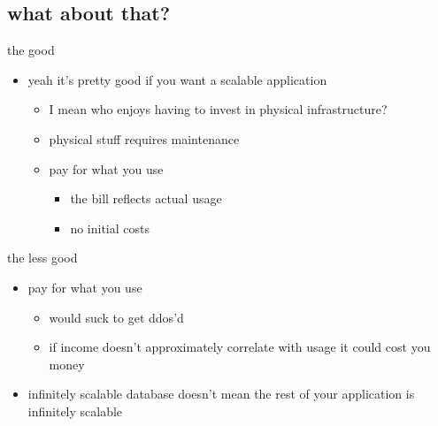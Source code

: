 \documentclass{beamer}
\begin{document}
  \subsection{what about that?}
  \begin{frame}{the good}
    \begin{itemize}
    \item
      yeah it's pretty good if you want a scalable application
      \begin{itemize}
      \item
        I mean who enjoys having to invest in physical infrastructure?
      \item
        physical stuff requires maintenance
      \item
        pay for what you use
        \begin{itemize}
        \item
          the bill reflects actual usage
        \item
          no initial costs
        \end{itemize}
      \end{itemize}
    \end{itemize}
  \end{frame}
  \begin{frame}{the less good}
    \begin{itemize}
    \item
      pay for what you use
      \begin{itemize}
        \item
        would suck to get ddos'd
        \item
        if income doesn't approximately correlate with usage it could cost you money
      \end{itemize}
    \item
      infinitely scalable database doesn't mean the rest of your application is infinitely scalable
    \end{itemize}
  \end{frame}
\end{document}
